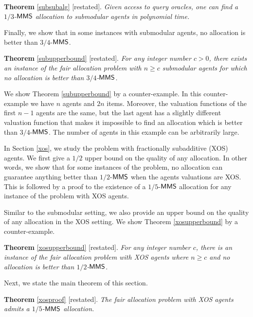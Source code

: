 \vspace{0.2cm}
{\noindent \textbf{Theorem} \ref{subsubalg} [restated]. \textit{Given access to query oracles, one can find a $1/3$-$\mathsf{MMS}$ allocation to submodular agents in polynomial time.\\}}


Finally, we show that in some instances with submodular agents, no allocation is better than $3/4$-$\mathsf{MMS}$.

\vspace{0.2cm}
{\noindent \textbf{Theorem} \ref{subupperbound} [restated]. \textit{For any integer number $c > 0$, there exists an instance of the fair allocation problem with $n \geq c$  submodular agents for which no allocation is better than $3/4$-$\mathsf{MMS}$.
\\}}


We show Theorem \ref{subupperbound} by a counter-example. In this counter-example we have $n$ agents and $2n$ items. Moreover, the valuation functions of the first $n-1$ agents are the same, but the last agent has a slightly different valuation function that makes it impossible to find an allocation which is better than $3/4$-$\mathsf{MMS}$. The number of agents in this example can be arbitrarily large.


In Section \ref{xos}, we study the problem with fractionally subadditive (XOS) agents. We first give a $1/2$ upper bound on the quality of any allocation. In other words, we show that for some instances of the problem, no allocation can guarantee anything better than $1/2$-$\mathsf{MMS}$ when the agents valuations are XOS. This is followed by a proof to the existence of a $1/5$-$\mathsf{MMS}$ allocation for any instance of the problem with XOS agents.


Similar to the submodular setting, we also provide an upper bound on the quality of any allocation in the XOS setting. We show Theorem \ref{xosupperbound} by a counter-example.

\vspace{0.2cm}
{\noindent \textbf{Theorem} \ref{xosupperbound} [restated].\textit{ For any integer number $c$, there is an instance of the fair allocation problem with XOS agents where $n \geq c$ and no allocation is better than $1/2$-$\mathsf{MMS}$.\\}}

Next, we state the main theorem of this section.

\vspace{0.2cm}
{\noindent \textbf{Theorem} \ref{xosproof} [restated].\textit{ The fair allocation problem with XOS agents admits a $1/5$-$\mathsf{MMS}$ allocation.\\}}

